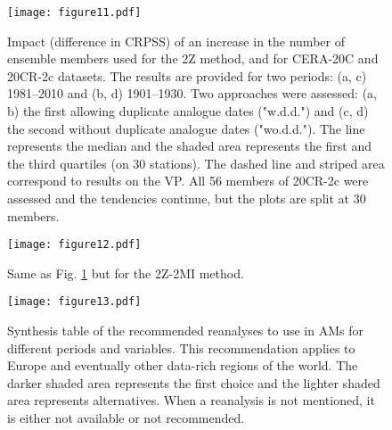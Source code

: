 \documentclass[smallextended]{svjour3}       %
\begin{document}
	\begin{figure}
		\texttt{[image: figure11.pdf]}\\
		\caption{Impact (difference in CRPSS) of an increase in the number of ensemble members used for the 2Z method, and for CERA-20C and 20CR-2c datasets. The results are provided for two periods: (a, c) 1981--2010 and (b, d) 1901--1930. Two approaches were assessed: (a, b) the first allowing duplicate analogue dates ("w.d.d.") and (c, d) the second without duplicate analogue dates ("wo.d.d."). The line represents the median and the shaded area represents the first and the third quartiles (on 30 stations). The dashed line and striped area correspond to results on the VP. All 56 members of 20CR-2c were assessed and the tendencies continue, but the plots are split at 30 members.}
		\label{fig:plot_impact_members_2Z}
	\end{figure}
	
	\begin{figure}
		\texttt{[image: figure12.pdf]}\\
		\caption{Same as Fig. \ref{fig:plot_impact_members_2Z} but for the 2Z-2MI method.}
		\label{fig:plot_impact_members_2Z-2MI}
	\end{figure}
	
	\begin{figure}
		\texttt{[image: figure13.pdf]}\\
		\caption{Synthesis table of the recommended reanalyses to use in AMs for different periods and variables. This recommendation applies to Europe and eventually other data-rich regions of the world. The darker shaded area represents the first choice and the lighter shaded area represents alternatives. When a reanalysis is not mentioned, it is either not available or not recommended.}
		\label{fig:synthesis-table}
	\end{figure}
	
\end{document}
